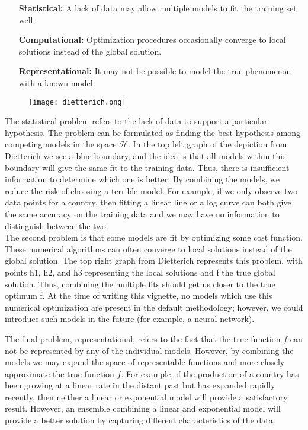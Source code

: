 \documentclass[nojss]{jss}\usepackage[]{graphicx}\usepackage[]{color}
\begin{document}
\begin{itemize}
  \setlength{\itemindent}{1in}
  \item[\textbf{Statistical:}] A lack of data may allow multiple models to fit the training set well.
  \item[\textbf{Computational:}] Optimization procedures occasionally converge to local solutions instead of the global solution.
  \item[\textbf{Representational:}] It may not be possible to model the true phenomenon with a known model.
\end{itemize}

\begin{figure}[!ht]
  \centering
  \texttt{[image: dietterich.png]}
\end{figure}

The statistical problem refers to the lack of data to support a
particular hypothesis. The problem can be formulated as finding the
best hypothesis among competing models in the space
$\mathbf{\mathcal{H}}$. In the top left graph of the
depiction from Dietterich we see a blue boundary, and the idea is that all
models within this boundary will give the same fit to the training data.
Thus, there is insufficient information to determine which one is better.
By combining the models, we reduce the risk of choosing a terrible model.
For example, if we only observe two data points for a country, then
fitting a linear line or a log curve can both give the same accuracy
on the training data and we may have no information to distinguish
between the two.\\

The second problem is that some models are fit by optimizing some cost function.  These numerical algorithms can often converge to local solutions instead of the global solution.  The top right graph from Dietterich represents this problem, with points h1, h2, and h3 representing the local solutions and f the true global solution.  Thus, combining the multiple fits should get us closer to the true optimum f.  At the time of writing this vignette, no models which use this numerical optimization are present in the default methodology; however, we could introduce such models in the future (for example, a neural network).

The final problem, representational, refers to the fact that the true
function $f$ can not be represented by any of the individual models. However, by
combining the models we may expand the space of representable
functions and more closely approximate the true function $f$.  For example, if
the production of a country has been growing at a linear rate in the
distant past but has expanded rapidly recently, then neither a linear or
exponential model will provide a satisfactory result. However, an
ensemble combining a linear and exponential model will provide a better
solution by capturing different characteristics of the data.\\
\end{document}
